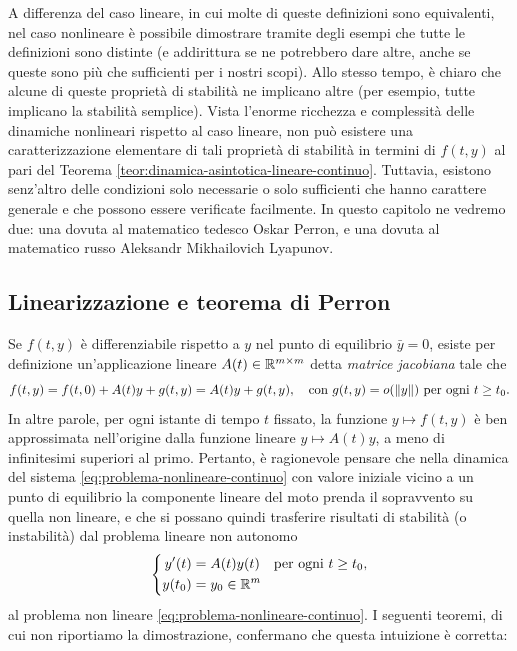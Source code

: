 \noindent A differenza del caso lineare, in cui molte di queste definizioni
sono equivalenti, nel caso nonlineare è possibile dimostrare tramite degli
esempi che tutte le definizioni sono distinte (e addirittura se ne potrebbero
dare altre, anche se queste sono più che sufficienti per i nostri scopi).
Allo stesso tempo, è chiaro che alcune di queste proprietà di stabilità
ne implicano altre (per esempio, tutte implicano la stabilità semplice).
Vista l'enorme ricchezza e complessità delle dinamiche nonlineari rispetto
al caso lineare, non può esistere una caratterizzazione elementare
di tali proprietà di stabilità in termini di $f(t,y)$ al pari del
Teorema \ref{teor:dinamica-asintotica-lineare-continuo}.
Tuttavia, esistono senz'altro delle condizioni solo necessarie o solo sufficienti
che hanno carattere generale e che possono essere verificate facilmente.
In questo capitolo ne vedremo due: una dovuta al matematico tedesco Oskar Perron,
e una dovuta al matematico russo Aleksandr Mikhailovich Lyapunov.

\subsection*{Linearizzazione e teorema di Perron}

Se $f(t,y)$ è differenziabile rispetto a $y$ nel punto di equilibrio $\bar{y} = 0$,
esiste per definizione un'applicazione lineare $A(t) \in \mathbb{R}^{m \times m}$
detta \emph{matrice jacobiana} tale che
\[
f(t,y) = f(t,0) + A(t)y + g(t,y) = A(t)y + g(t,y),
\quad \text{con $g(t,y) = o(\left\lVert y\right\rVert)$ per ogni $t \geq t_0$}.
\]
In altre parole, per ogni istante di tempo $t$ fissato, la funzione $y \mapsto f(t,y)$
è ben approssimata nell'origine dalla funzione lineare $y \mapsto A(t)y$,
a meno di infinitesimi superiori al primo.
Pertanto, è ragionevole pensare che nella dinamica del
sistema \eqref{eq:problema-nonlineare-continuo} con valore iniziale
vicino a un punto di equilibrio la componente lineare del moto prenda il
sopravvento su quella non lineare, e che si possano quindi trasferire
risultati di stabilità (o instabilità) dal problema lineare non autonomo
\begin{equation} \label{eq:problema-lineare-nonautonomo-continuo}
\left\{
\begin{aligned}
y'(t)  &= A(t)y(t) \quad \text{per ogni $t \geq t_0$}, \\
y(t_0) &= y_0 \in \mathbb{R}^m
\end{aligned}
\right.
\end{equation}
al problema non lineare \eqref{eq:problema-nonlineare-continuo}.
I seguenti teoremi, di cui non riportiamo la dimostrazione, confermano
che questa intuizione è corretta:

